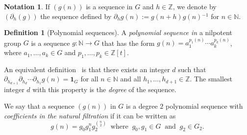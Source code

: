 \documentclass[11pt]{amsart}
\theoremstyle{definition}
\newtheorem*{notation}{Notation}
\newtheorem*{definition}{Definition}
\begin{document}
\begin{notation} If $(g(n))$ is a sequence in $G$ and $h\in {{\mathbb Z}}$,
we denote by $(\partial_h(g))$ the sequence defined by
$\partial_hg(n):=g(n+h)g(n){^{-1}}$ for $n\in {{\mathbb N}}$.
\end{notation}

\begin{definition}[Polynomial sequences]
A \emph{polynomial sequence in} a nilpotent group $G$ is  a sequence
$g\colon {{\mathbb N}}\to G$ that has the form $g(n)=a_1^{p_1(n)}\cdots
a_k^{p_k(n)}$, where $a_1,\ldots, a_k\in G$ and $p_1,\ldots, p_k\in
{{\mathbb Z}}[t]$.

An equivalent definition~\cite[Lemma~6.7]{GT12a} is that there
exists an integer $d$ such that
$\partial_{h_{d+1}}\partial_{h_d}\cdots
\partial_{h_1}g(n)={\mathbf{1}}_G$ for all $n\in {{\mathbb N}}$ and all $h_1,\ldots,
h_{d+1}\in {{\mathbb Z}}$. The smallest integer $d$ with this property is the
\emph{degree} of the sequence.

We say that a sequence $(g(n))$ in $G$ is a degree $2$ polynomial
sequence with \emph{coefficients in the natural filtration} if it
can be written as
$$
g(n)=g_0g_1^ng_2^{\binom n2}\ \text{ where }\ g_0,g_1\in G\ \text{ and }\ g_2\in G_2.
$$
\end{definition}
\end{document}
